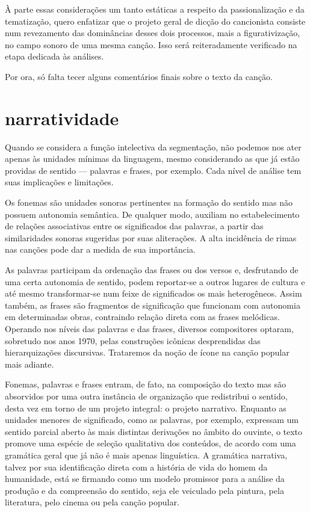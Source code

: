 À parte essas considerações um tanto estáticas a respeito da
passionalização e da tematização, quero enfatizar que o projeto geral de
dicção do cancionista consiste num revezamento das dominâncias desses
dois processos, mais a figurativização, no campo sonoro de uma mesma
canção. Isso será reiteradamente verificado na etapa dedicada às
análises.

Por ora, só falta tecer alguns comentários finais sobre o texto da
canção.

\section{narratividade}

Quando se considera a função intelectiva da segmentação, não podemos nos
ater apenas às unidades mínimas da linguagem, mesmo considerando as que
já estão providas de sentido --- palavras e frases, por exemplo. Cada
nível de análise tem suas implicações e limitações.

Os fonemas são unidades sonoras pertinentes na formação do sentido mas
não possuem autonomia semântica. De qualquer modo, auxiliam no
estabelecimento de relações associativas entre os significados das
palavras, a partir das similaridades sonoras sugeridas por suas
aliterações. A alta incidência de rimas nas canções pode dar a medida de
sua importância.

As palavras participam da ordenação das frases ou dos versos e,
desfrutando de uma certa autonomia de sentido, podem reportar-se a outros
lugares de cultura e até mesmo transformar-se num feixe de significados
os mais heterogêneos. Assim também, as frases são fragmentos de
significação que funcionam com autonomia em determinadas obras,
contraindo relação direta com as frases melódicas. Operando nos níveis
das palavras e das frases, diversos compositores optaram, sobretudo nos
anos 1970, pelas construções icônicas desprendidas das hierarquizações
discursivas. Trataremos da noção de ícone na canção popular mais
adiante.

Fonemas, palavras e frases entram, de fato, na composição do texto mas
são absorvidos por uma outra instância de organização que redistribui o
sentido, desta vez em torno de um projeto integral: o projeto narrativo.
Enquanto as unidades menores de significado, como as palavras, por
exemplo, expressam um sentido parcial aberto às mais distintas
derivações no âmbito do ouvinte, o texto promove uma espécie de seleção
qualitativa dos conteúdos, de acordo com uma gramática geral que já não
é mais apenas linguística. A gramática narrativa, talvez por sua
identificação direta com a história de vida do homem da humanidade, está
se firmando como um modelo promissor para a análise da produção e da
compreensão do sentido, seja ele veiculado pela pintura, pela
literatura, pelo cinema ou pela canção popular. 

